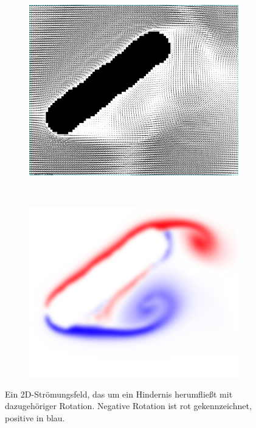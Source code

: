 \begin{figure}
	\begin{subfigure}[b]{0.5\textwidth}
		\centering
		\includegraphics[width=\textwidth]{images/vector_field_rotation_arrows}
		\label{fig:mathematics_image_vectorfield_rotation_arrows}
	\end{subfigure}
	~
	\begin{subfigure}[b]{0.5\textwidth}
		\centering
		\includegraphics[width=\textwidth]{images/vector_field_rotation}
	\end{subfigure}
	\caption{Ein 2D-Strömungsfeld, das um ein Hindernis herumfließt mit dazugehöriger Rotation. Negative Rotation ist rot gekennzeichnet, positive in blau.}
\end{figure}


